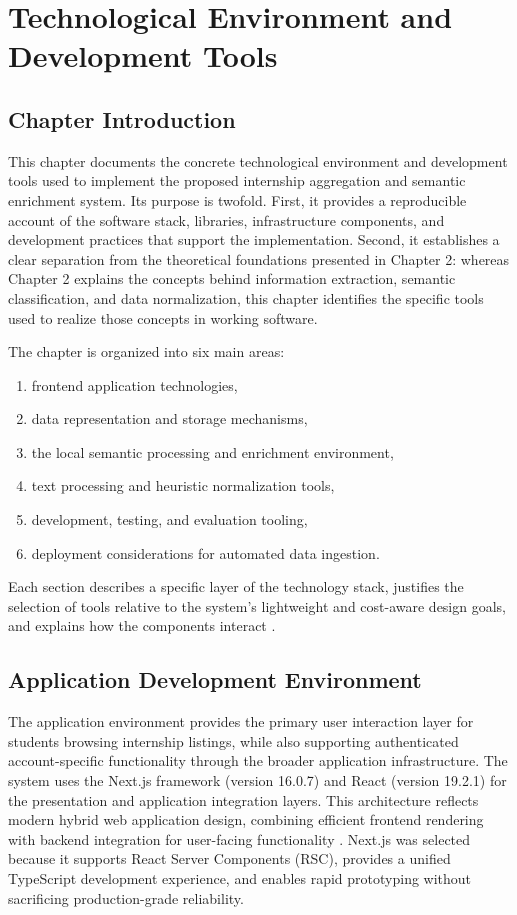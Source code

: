 \chapter{Technological Environment and Development Tools}
\section{Chapter Introduction}
This chapter documents the concrete technological environment and development tools used to implement the proposed internship aggregation and semantic enrichment system. Its purpose is twofold. First, it provides a reproducible account of the software stack, libraries, infrastructure components, and development practices that support the implementation. Second, it establishes a clear separation from the theoretical foundations presented in Chapter 2: whereas Chapter 2 explains the concepts behind information extraction, semantic classification, and data normalization, this chapter identifies the specific tools used to realize those concepts in working software.

The chapter is organized into six main areas:

\begin{enumerate}[label=\textbf{\arabic*:}, start=1, leftmargin=2.2cm]
    \item frontend application technologies,
    \item data representation and storage mechanisms,
    \item the local semantic processing and enrichment environment,
    \item text processing and heuristic normalization tools,
    \item development, testing, and evaluation tooling,
    \item deployment considerations for automated data ingestion.
\end{enumerate}

Each section describes a specific layer of the technology stack, justifies the selection of tools relative to the system's lightweight and cost-aware design goals, and explains how the components interact \cite{hevner2004design, bass2012software}.
\section{Application Development Environment}
The application environment provides the primary user interaction layer for students browsing internship listings, while also supporting authenticated account-specific functionality through the broader application infrastructure. The system uses the Next.js framework (version 16.0.7) and React (version 19.2.1) for the presentation and application integration layers.
This architecture reflects modern hybrid web application design, combining efficient frontend rendering with backend integration for user-facing functionality \cite{riva2022realworld, bass2012software}. Next.js was selected because it supports React Server Components (RSC), provides a unified TypeScript development experience, and enables rapid prototyping without sacrificing production-grade reliability.
